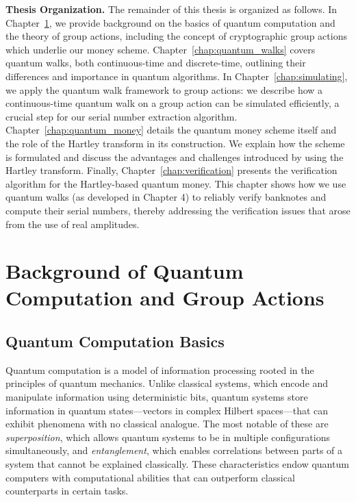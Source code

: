 \documentclass[12pt]{report}
\begin{document}
\medskip\noindent\textbf{Thesis Organization.} 
The remainder of this thesis is organized as follows. In Chapter~\ref{chap:backgound}, we provide background on the basics of quantum computation and the theory of group actions, including the concept of cryptographic group actions which underlie our money scheme. Chapter~\ref{chap:quantum_walks} covers quantum walks, both continuous-time and discrete-time, outlining their differences and importance in quantum algorithms. In Chapter~\ref{chap:simulating}, we apply the quantum walk framework to group actions: we describe how a continuous-time quantum walk on a group action can be simulated efficiently, a crucial step for our serial number extraction algorithm. Chapter~\ref{chap:quantum_money} details the quantum money scheme itself and the role of the Hartley transform in its construction. We explain how the scheme is formulated and discuss the advantages and challenges introduced by using the Hartley transform. Finally, Chapter~\ref{chap:verification} presents the verification algorithm for the Hartley-based quantum money. This chapter shows how we use quantum walks (as developed in Chapter 4) to reliably verify banknotes and compute their serial numbers, thereby addressing the verification issues that arose from the use of real amplitudes.
\vspace{1em}



\chapter{Background of Quantum Computation and Group Actions}\label{chap:backgound}



\section{Quantum Computation Basics}


Quantum computation is a model of information processing rooted in the principles of quantum mechanics. Unlike classical systems, which encode and manipulate information using deterministic bits, quantum systems store information in quantum states—vectors in complex Hilbert spaces—that can exhibit phenomena with no classical analogue. The most notable of these are \emph{superposition}, which allows quantum systems to be in multiple configurations simultaneously, and \emph{entanglement}, which enables correlations between parts of a system that cannot be explained classically. These characteristics endow quantum computers with computational abilities that can outperform classical counterparts in certain tasks.
\end{document}
